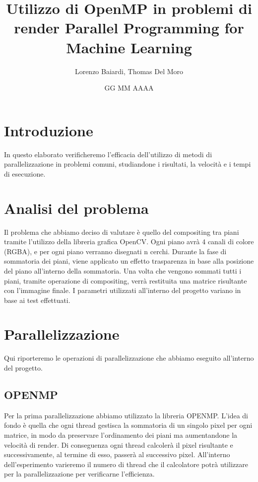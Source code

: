 \documentclass[11pt]{article}
\title{Utilizzo di OpenMP in problemi di render
Parallel Programming for Machine Learning}
\author{Lorenzo Baiardi, Thomas Del Moro}
\date{GG MM AAAA}
\begin{document}
    \maketitle
    \clearpage

    \tableofcontents
    \clearpage

    \section{Introduzione}\label{sec:introduzione}
    In questo elaborato verificheremo l'efficacia dell'utilizzo di metodi di parallelizzazione in problemi comuni,
    studiandone i risultati, la velocità e i tempi di esecuzione.
    \clearpage

    \section{Analisi del problema}\label{sec:analisi-del-problema}
    Il problema che abbiamo deciso di valutare è quello del compositing tra piani tramite l'utilizzo della libreria
    grafica OpenCV\@.
    Ogni piano avrà 4 canali di colore (RGBA), e per ogni piano verranno disegnati n cerchi.
    Durante la fase di sommatoria dei piani, viene applicato un effetto trasparenza in base alla posizione del piano
    all'interno della sommatoria.
    Una volta che vengono sommati tutti i piani, tramite operazione di compositing, verrà restituita una matrice
    risultante con l'immagine finale.
    I parametri utilizzati all'interno del progetto variano in base ai test effettuati.
    \clearpage

    \section{Parallelizzazione}\label{sec:parallelizazzione}
    Qui riporteremo le operazioni di parallelizzazione che abbiamo eseguito all'interno del progetto.

    \subsection{OPENMP}\label{subsec:openmp}
    Per la prima parallelizzazione abbiamo utilizzato la libreria OPENMP\@.
    L'idea di fondo è quella che ogni thread gestisca la sommatoria di un singolo pixel per ogni matrice, in
    modo da preservare l'ordinamento dei piani ma aumentandone la velocità di render.
    Di conseguenza ogni thread calcolerà il pixel risultante e successivamente, al termine di esso, passerà
    al successivo pixel.
    All'interno dell'esperimento varieremo il numero di thread che il calcolatore potrà utilizzare per la
    parallelizzazione per verificarne l'efficienza.
\end{document}

